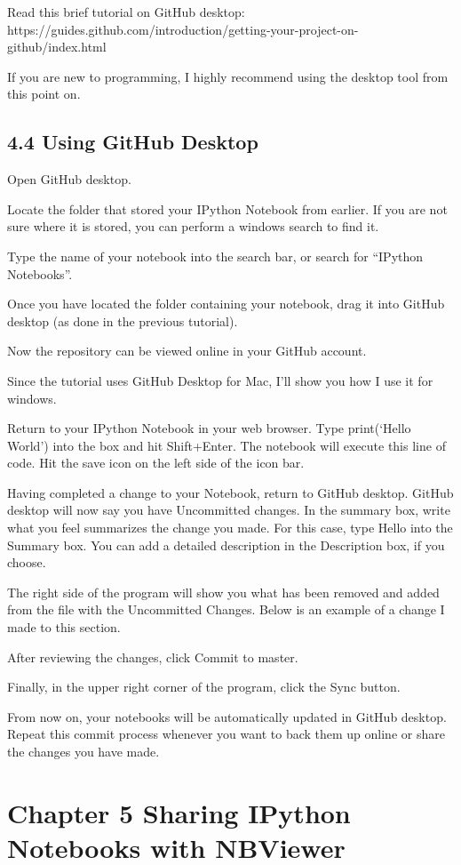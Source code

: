 \documentclass{article}
\begin{document}
Read this brief tutorial on GitHub desktop:
https://guides.github.com/introduction/getting-your-project-on-github/index.html

If you are new to programming, I highly recommend using the desktop tool
from this point on.


    \subsection{4.4 Using GitHub Desktop}


    Open GitHub desktop.

Locate the folder that stored your IPython Notebook from earlier. If you
are not sure where it is stored, you can perform a windows search to
find it.

Type the name of your notebook into the search bar, or search for
``IPython Notebooks''.

Once you have located the folder containing your notebook, drag it into
GitHub desktop (as done in the previous tutorial).

Now the repository can be viewed online in your GitHub account.

Since the tutorial uses GitHub Desktop for Mac, I'll show you how I use
it for windows.

Return to your IPython Notebook in your web browser. Type print(`Hello
World') into the box and hit Shift+Enter. The notebook will execute this
line of code. Hit the save icon on the left side of the icon bar.

Having completed a change to your Notebook, return to GitHub desktop.
GitHub desktop will now say you have Uncommitted changes. In the summary
box, write what you feel summarizes the change you made. For this case,
type Hello into the Summary box. You can add a detailed description in
the Description box, if you choose.

The right side of the program will show you what has been removed and
added from the file with the Uncommitted Changes. Below is an example of
a change I made to this section.

After reviewing the changes, click Commit to master.

Finally, in the upper right corner of the program, click the Sync
button.

From now on, your notebooks will be automatically updated in GitHub
desktop. Repeat this commit process whenever you want to back them up
online or share the changes you have made. 


    \section{Chapter 5 Sharing IPython Notebooks with NBViewer}
\end{document}

